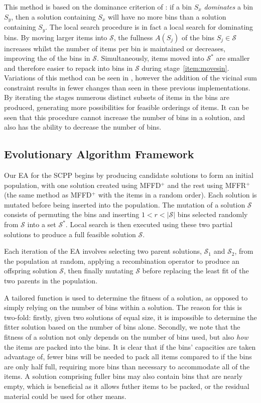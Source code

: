 \documentclass[authoryear]{elsarticle}
\begin{document}
This method is based on the dominance criterion of \citet{martello1990l}: if a bin $S_x$ \emph{dominates} a bin $S_y$, then a solution containing $S_x$ will have no more bins than a solution containing $S_y$. The local search procedure is in fact a local search for dominating bins. By moving larger items into $\mathcal{S}$, the fullness $A(S_j)$ of the bins $S_j \in \mathcal{S}$ increases whilst the number of items per bin is maintained or decreases, improving the  of the bins in $\mathcal{S}$. Simultaneously, items moved into $\mathcal{S}^*$ are smaller and therefore easier to repack into bins in $\mathcal{S}$ during stage~\ref{item:movesin}. Variations of this method can be seen in \citet{lewis2009, lewis2017, falkenauer1996, levine2004}, however the addition of the vicinal sum constraint results in fewer changes than seen in these previous implementations. By iterating the stages numerous distinct subsets of items in the bins are produced, generating more possibilities for feasible orderings of items. It can be seen that this procedure cannot increase the number of bins in a solution, and also has the ability to decrease the number of bins.


\subsection{Evolutionary Algorithm Framework}
\label{sub:eaframework}
\noindent Our EA for the SCPP begins by producing candidate solutions to form an initial population, with one solution created using MFFD$^+$ and the rest using MFFR$^+$ (the same method as MFFD$^+$ with the items in a random order). Each solution is mutated before being inserted into the population. The mutation of a solution $\mathcal{S}$ consists of permuting the bins and inserting $1 < r < |\mathcal{S}|$ bins selected randomly from $\mathcal{S}$ into a set $\mathcal{S}^*$. Local search is then executed using these two partial solutions to produce a full feasible solution $\mathcal{S}$. 

Each iteration of the EA involves selecting two parent solutions, $\mathcal{S}_1$ and $\mathcal{S}_2$, from the population at random, applying a recombination operator to produce an offspring solution $\mathcal{S}$, then finally mutating $\mathcal{S}$ before replacing the least fit of the two parents in the population.

A tailored function is used to determine the fitness of a solution, as opposed to simply relying on the number of bins within a solution. The reason for this is two-fold: firstly, given two solutions of equal size, it is impossible to determine the fitter solution based on the number of bins alone. Secondly, we note that the fitness of a solution not only depends on the number of bins used, but also \emph{how} the items are packed into the bins. It is clear that if the bins' capacities are taken advantage of, fewer bins will be needed to pack all items compared to if the bins are only half full, requiring more bins than necessary to accommodate all of the items. A solution comprising fuller bins may also contain bins that are nearly empty, which is beneficial as it allows futher items to be packed, or the residual material could be used for other means. 
\end{document}
